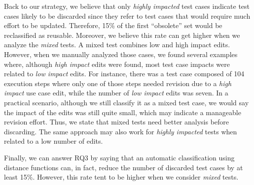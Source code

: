 Back to our strategy, we believe that only \textit{highly impacted} test cases indicate test cases likely to be discarded since they refer to test cases that would require much effort to be updated. Therefore, 15\% of the first ``obsolete'' set would be reclassified as reusable. Moreover, we believe this rate can get higher when we analyze the \textit{mixed} tests. A mixed test combines low and high impact edits. However, when we manually analyzed those cases, we found several examples where, although \textit{high impact} edits were found, most test case impacts were related to \textit{low impact} edits. For instance, there was a test case composed of 104 execution steps where only one of those steps needed revision due to a \textit{high impact} use case edit, while the number of \textit{low impact} edits was seven. In a practical scenario, although we still classify it as a mixed test case, we would say the impact of the edits was still quite small, which may indicate a manageable revision effort. Thus, we state that mixed tests need better analysis before discarding. The same approach may also work for \textit{highly impacted} tests when related to a low number of edits.

Finally, we can answer RQ3 by saying that an automatic classification using distance functions can, in fact, reduce the number of discarded test cases by at least 15\%. However, this rate tent to be higher when we consider \textit{mixed} tests.
\\
\\
\noindent
\vspace{2mm} %







